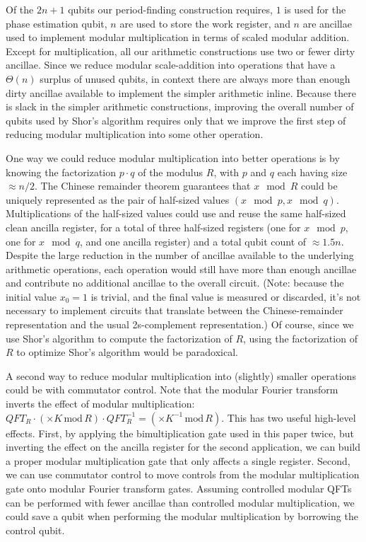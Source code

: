 \documentclass[twocolumn,longbibliography]{quantumarticle}
\begin{document}
Of the $2n+1$ qubits our period-finding construction requires, $1$ is used for the phase estimation qubit, $n$ are used to store the work register, and $n$ are ancillae used to implement modular multiplication in terms of scaled modular addition.
Except for multiplication, all our arithmetic constructions use two or fewer dirty ancillae.
Since we reduce modular scale-addition into operations that have a $\Theta(n)$ surplus of unused qubits, in context there are always more than enough dirty ancillae available to implement the simpler arithmetic inline.
Because there is slack in the simpler arithmetic constructions, improving the overall number of qubits used by Shor's algorithm requires only that we improve the first step of reducing modular multiplication into some other operation.

One way we could reduce modular multiplication into better operations is by knowing the factorization $p \cdot q$ of the modulus $R$, with $p$ and $q$ each having size $\approx n/2$.
The Chinese remainder theorem guarantees that $x \mod R$ could be uniquely represented as the pair of half-sized values $(x \mod p, x \mod q)$.
Multiplications of the half-sized values could use and reuse the same half-sized clean ancilla register, for a total of three half-sized registers (one for $x \mod p$, one for $x \mod q$, and one ancilla register) and a total qubit count of $\approx 1.5n$.
Despite the large reduction in the number of ancillae available to the underlying arithmetic operations, each operation would still have more than enough ancillae and contribute no additional ancillae to the overall circuit.
(Note: because the initial value $x_0 = 1$ is trivial, and the final value is measured or discarded, it's not necessary to implement circuits that translate between the Chinese-remainder representation and the usual 2s-complement representation.)
Of course, since we use Shor's algorithm to compute the factorization of $R$, using the factorization of $R$ to optimize Shor's algorithm would be paradoxical.

A second way to reduce modular multiplication into (slightly) smaller operations could be with commutator control.
Note that the modular Fourier transform inverts the effect of modular multiplication: $QFT_{R} \cdot (\times K \,\text{mod}\, R) \cdot QFT_R^{-1} = (\times K^{-1} \,\text{mod}\, R)$.
This has two useful high-level effects.
First, by applying the bimultiplication gate used in this paper twice, but inverting the effect on the ancilla register for the second application, we can build a proper modular multiplication gate that only affects a single register.
Second, we can use commutator control to move controls from the modular multiplication gate onto modular Fourier transform gates.
Assuming controlled modular QFTs can be performed with fewer ancillae than controlled modular multiplication, we could save a qubit when performing the modular multiplication by borrowing the control qubit.
\end{document}
